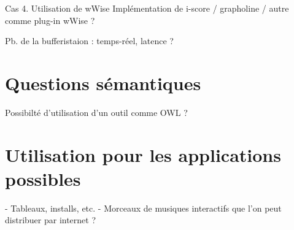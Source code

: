 \documentclass[french,12pt,a4paper]{article}
\begin{document}
Cas 4. Utilisation de wWise 
Implémentation de i-score / grapholine / autre comme plug-in wWise ?

Pb. de la bufferistaion : temps-réel, latence ?

\section{Questions sémantiques}
Possibilté d'utilisation d'un outil comme OWL ?

\section{Utilisation pour les applications possibles}
- Tableaux, installs, etc.
- Morceaux de musiques interactifs que l'on peut distribuer par internet ?
\end{document}
